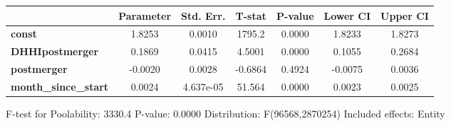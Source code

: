 \documentclass{report}
\begin{document}
\begin{center}
\begin{tabular}{lcccccc}
                             & \textbf{Parameter} & \textbf{Std. Err.} & \textbf{T-stat} & \textbf{P-value} & \textbf{Lower CI} & \textbf{Upper CI}  \\
\midrule
\textbf{const}               &       1.8253       &       0.0010       &      1795.2     &      0.0000      &       1.8233      &       1.8273       \\
\textbf{DHHIpostmerger}      &       0.1869       &       0.0415       &      4.5001     &      0.0000      &       0.1055      &       0.2684       \\
\textbf{postmerger}          &      -0.0020       &       0.0028       &     -0.6864     &      0.4924      &      -0.0075      &       0.0036       \\
\textbf{month\_since\_start} &       0.0024       &     4.637e-05      &      51.564     &      0.0000      &       0.0023      &       0.0025       \\
\bottomrule
\end{tabular}
\end{center}

F-test for Poolability: 3330.4 \newline
 P-value: 0.0000 \newline
 Distribution: F(96568,2870254) \newline
  \newline
 Included effects: Entity
\end{document}

